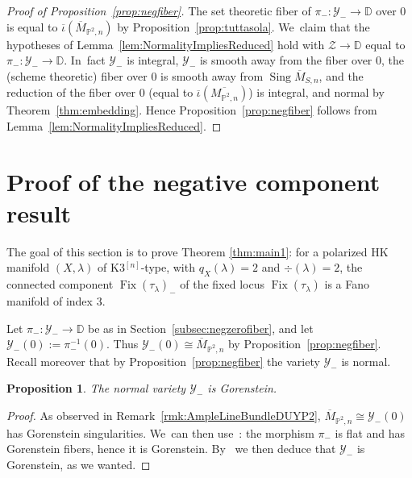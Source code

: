 \documentclass[JEP,XML,SOM,Unicode,published]{cedram}
\newcommand{\HK}{\textup{HK}\xspace}
\newcommand{\DD}{{\mathbb D}}
\newcommand{\PP}{{\mathbb P}}\let\P\PP
\newcommand\cY{\mathcal{Y}}
\DeclareMathOperator{\Fix}{Fix}
\DeclareMathOperator{\Sing}{Sing}
\let\ov\overline
\newtheorem{prop}[lemm]{Proposition}
\theoremstyle{definition}
\def\citestacks#1{\cite[\href{https://stacks.math.columbia.edu/tag/#1}{Tag #1}]{stacks-project}}
\begin{document}
\begin{proof}[Proof of Proposition~\ref{prop:negfiber}]
The set theoretic fiber of $\pi_{-}\colon\cY_{-}\to\DD$ over $0$ is equal to $\ov{\iota}(\ov{M}_{\PP^2,n})$ by Proposition~\ref{prop:tuttasola}. We~claim that the hypotheses of Lemma~\ref{lem:NormalityImpliesReduced} hold with $\mathcal{Z}\to\DD$ equal to $\pi_{-}\colon\cY_{-}\to\DD$. In~fact $\cY_{-}$ is integral, $\cY_{-}$ is smooth away from the fiber over $0$, the (scheme theoretic) fiber over $0$ is smooth away from $\Sing \ov{M}_{S,n}$, and the reduction of the fiber over $0$ (equal to $\ov{\iota}(\ov{M{_{\PP^2,n}}})$) is integral, and normal by Theorem~\ref{thm:embedding}. Hence Proposition~\ref{prop:negfiber} follows from Lemma~\ref{lem:NormalityImpliesReduced}.
\end{proof}

\section{Proof of the negative component result}\label{sec:MainResult}

The goal of this section is to prove Theorem \ref{thm:main1}: for a polarized \HK manifold $(X,\lambda)$ of K3$^{[n]}$-type, with $q_X(\lambda)=2$ and $\div(\lambda)=2$, the connected component $\Fix(\tau_{\lambda})_-$ of the fixed locus $\Fix(\tau_\lambda)$ is a Fano manifold of index $3$.

Let $\pi_{-}\colon\cY_{-}\to \DD$ be as in Section~\ref{subsec:negzerofiber}, and let $\cY_{-}(0):=\pi_{-}^{-1}(0)$.
Thus $\cY_{-}(0)\cong\overline{M}_{\PP^2,n}$ by Proposition~\ref{prop:negfiber}.
Recall moreover that by Proposition~\ref{prop:negfiber} the variety $\cY_{-}$ is normal.

\begin{prop}\label{prop:KM}
The normal variety $\cY_-$ is Gorenstein.
\end{prop}

\begin{proof}
As observed in Remark~\ref{rmk:AmpleLineBundleDUYP2}, $\overline{M}_{\PP^2,n}\cong\cY_{-}(0)$ has Gorenstein singularities. We~can then use~\citestacks{0C05}: the morphism $\pi_-$ is flat and has Gorenstein fibers, hence it is Gorenstein.
By~\citestacks{0C11} we then deduce that $\cY_-$ is Gorenstein, as we wanted.
\end{proof}
\end{document}
